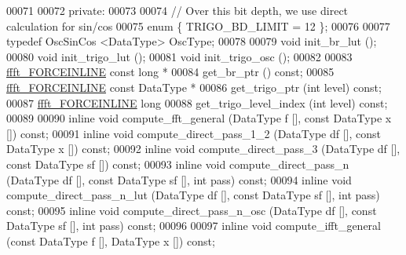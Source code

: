\begin{DoxyCode}
00071 
00072 \textcolor{keyword}{private}:
00073 
00074    \textcolor{comment}{// Over this bit depth, we use direct calculation for sin/cos}
00075    \textcolor{keyword}{enum} \{         TRIGO\_BD\_LIMIT    = 12  \};
00076 
00077     \textcolor{keyword}{typedef} OscSinCos <DataType>    OscType;
00078 
00079     \textcolor{keywordtype}{void}                init\_br\_lut ();
00080     \textcolor{keywordtype}{void}                init\_trigo\_lut ();
00081     \textcolor{keywordtype}{void}                init\_trigo\_osc ();
00082 
00083     \hyperlink{a00089_a31b2ada863c9efa7455efae4e13661f3}{ffft\_FORCEINLINE} \textcolor{keyword}{const} \textcolor{keywordtype}{long} *
00084                         get\_br\_ptr () \textcolor{keyword}{const};
00085     \hyperlink{a00089_a31b2ada863c9efa7455efae4e13661f3}{ffft\_FORCEINLINE} \textcolor{keyword}{const} DataType *
00086                         get\_trigo\_ptr (\textcolor{keywordtype}{int} level) \textcolor{keyword}{const};
00087     \hyperlink{a00089_a31b2ada863c9efa7455efae4e13661f3}{ffft\_FORCEINLINE} \textcolor{keywordtype}{long}
00088                         get\_trigo\_level\_index (\textcolor{keywordtype}{int} level) \textcolor{keyword}{const};
00089 
00090     \textcolor{keyword}{inline} \textcolor{keywordtype}{void}     compute\_fft\_general (DataType f [], \textcolor{keyword}{const} DataType x []) \textcolor{keyword}{const};
00091     \textcolor{keyword}{inline} \textcolor{keywordtype}{void}     compute\_direct\_pass\_1\_2 (DataType df [], \textcolor{keyword}{const} DataType x []) \textcolor{keyword}{const};
00092     \textcolor{keyword}{inline} \textcolor{keywordtype}{void}     compute\_direct\_pass\_3 (DataType df [], \textcolor{keyword}{const} DataType sf []) \textcolor{keyword}{const};
00093     \textcolor{keyword}{inline} \textcolor{keywordtype}{void}     compute\_direct\_pass\_n (DataType df [], \textcolor{keyword}{const} DataType sf [], \textcolor{keywordtype}{int} pass) \textcolor{keyword}{const};
00094     \textcolor{keyword}{inline} \textcolor{keywordtype}{void}     compute\_direct\_pass\_n\_lut (DataType df [], \textcolor{keyword}{const} DataType sf [], \textcolor{keywordtype}{int} pass) \textcolor{keyword}{const};
00095     \textcolor{keyword}{inline} \textcolor{keywordtype}{void}     compute\_direct\_pass\_n\_osc (DataType df [], \textcolor{keyword}{const} DataType sf [], \textcolor{keywordtype}{int} pass) \textcolor{keyword}{const};
00096 
00097     \textcolor{keyword}{inline} \textcolor{keywordtype}{void}     compute\_ifft\_general (\textcolor{keyword}{const} DataType f [], DataType x []) \textcolor{keyword}{const};

\end{DoxyCode}
